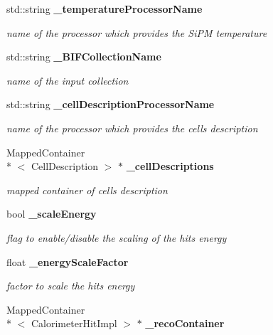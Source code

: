 \begin{DoxyCompactItemize}
\item 
std\-::string {\bf \-\_\-temperature\-Processor\-Name}\label{classCALICE_1_1Ahc2CalibrateProcessor_acb920d14fbddb7869a6563c9b8e0591d}

\begin{DoxyCompactList}\small\item\em name of the processor which provides the Si\-P\-M temperature \end{DoxyCompactList}\item 
std\-::string {\bf \-\_\-\-B\-I\-F\-Collection\-Name}\label{classCALICE_1_1Ahc2CalibrateProcessor_a506a8b03d3d6114e8c9372319748e9a3}

\begin{DoxyCompactList}\small\item\em name of the input collection \end{DoxyCompactList}\item 
std\-::string {\bf \-\_\-cell\-Description\-Processor\-Name}\label{classCALICE_1_1Ahc2CalibrateProcessor_abb12c048f5ca0a876f4112580dcd790e}

\begin{DoxyCompactList}\small\item\em name of the processor which provides the cells description \end{DoxyCompactList}\item 
Mapped\-Container\\*
$<$ Cell\-Description $>$ $\ast$ {\bf \-\_\-cell\-Descriptions}\label{classCALICE_1_1Ahc2CalibrateProcessor_a9569a1acebd769a434928d339a069eb3}

\begin{DoxyCompactList}\small\item\em mapped container of cells description \end{DoxyCompactList}\item 
bool {\bf \-\_\-scale\-Energy}\label{classCALICE_1_1Ahc2CalibrateProcessor_aef2b11d192204ebb3723fb47fe6a0976}

\begin{DoxyCompactList}\small\item\em flag to enable/disable the scaling of the hits energy \end{DoxyCompactList}\item 
float {\bf \-\_\-energy\-Scale\-Factor}\label{classCALICE_1_1Ahc2CalibrateProcessor_af0d0eb5ee2782716f379aff4798f7d0f}

\begin{DoxyCompactList}\small\item\em factor to scale the hits energy \end{DoxyCompactList}\item 
Mapped\-Container\\*
$<$ Calorimeter\-Hit\-Impl $>$ $\ast$ {\bf \-\_\-reco\-Container}\label{classCALICE_1_1Ahc2CalibrateProcessor_a51ad92c817fd651000dec667467090b5}


\end{DoxyCompactItemize}
